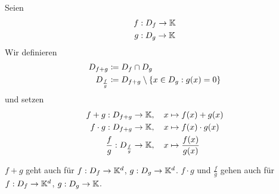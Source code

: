 \begin{notation}
    Seien
    \begin{align*}
        f&: D_f \rightarrow{} \mathbb{K}\\
        g&: D_g \rightarrow{} \mathbb{K}
    \end{align*}
    Wir definieren
    \begin{align*}
        D_{f+g} &\coloneqq D_f \cap D_g\\
        D_{\frac{f}{g}} &\coloneqq D_{f+g} \setminus\left\{x\in D_g: g(x)=0\right\}
    \end{align*}
    und setzen
    \begin{align*}
        f + g: D_{f+g} &\rightarrow{} \mathbb{K},\quad x \mapsto  f(x) + g(x)\\
        f \cdot g: D_{f+g} &\rightarrow{} \mathbb{K},\quad x \mapsto  f(x) \cdot g(x)\\
        \frac{f}{g}: D_{\frac{f}{g}} &\rightarrow{} \mathbb{K},\quad x \mapsto \frac{f(x)}{g(x)}
    \end{align*}
\end{notation}

\begin{bemerkung}
    $f+g$ geht auch für $f: D_f \rightarrow{} \mathbb{K}^d$, $g: D_g \rightarrow{} \mathbb{K}^d$. $f\cdot g$ und $\frac{f}{g}$ gehen auch für $f: D_f \rightarrow{} \mathbb{K}^d$, $g: D_g \rightarrow{} \mathbb{K}$.
\end{bemerkung}

\newpage

